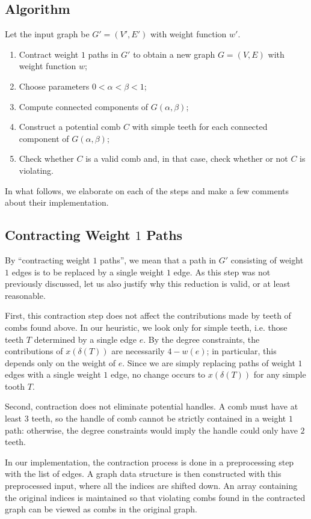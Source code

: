 \documentclass[11pt, letterpaper]{amsart}
\theoremstyle{plain}
\theoremstyle{definition}
\theoremstyle{remark}
\begin{document}
\subsection{Algorithm}
Let the input graph be $G' = (V',E')$ with weight function $w'$.
\begin{enumerate}
  \item Contract weight $1$ paths in $G'$ to obtain a new graph $G = (V,E)$
    with weight function $w$;
  \item Choose parameters $0 < \alpha < \beta < 1$;
  \item Compute connected components of $G(\alpha,\beta)$;
  \item Construct a potential comb $C$ with simple teeth for each connected
    component of $G(\alpha,\beta)$;
  \item Check whether $C$ is a valid comb and, in that case, check whether or not
    $C$ is violating.
\end{enumerate}
In what follows, we elaborate on each of the steps and make a few comments about
their implementation.

\subsection{Contracting Weight $1$ Paths}
By ``contracting weight $1$ paths'', we mean that a path in $G'$ consisting of
weight $1$ edges is to be replaced by a single weight $1$ edge. As this step was
not previously discussed, let us also justify why this reduction is valid, or at
least reasonable.

First, this contraction step does not affect the contributions made by teeth of
combs found above. In our heuristic, we look only for simple teeth, i.e. those
teeth $T$ determined by a single edge $e$. By the degree constraints, the
contributions of $x(\delta(T))$ are necessarily $4 - w(e)$; in particular, this
depends only on the weight of $e$. Since we are simply replacing paths of
weight $1$ edges with a single weight $1$ edge, no change occurs to
$x(\delta(T))$ for any simple tooth $T$.

Second, contraction does not eliminate potential handles. A comb must have at
least $3$ teeth, so the handle of comb cannot be strictly contained in a weight
$1$ path: otherwise, the degree constraints would imply the handle could only
have $2$ teeth.

In our implementation, the contraction process is done in a preprocessing step
with the list of edges. A graph data structure is then constructed with this
preprocessed input, where all the indices are shifted down. An array containing
the original indices is maintained so that violating combs found in the
contracted graph can be viewed as combs in the original graph.
\end{document}
